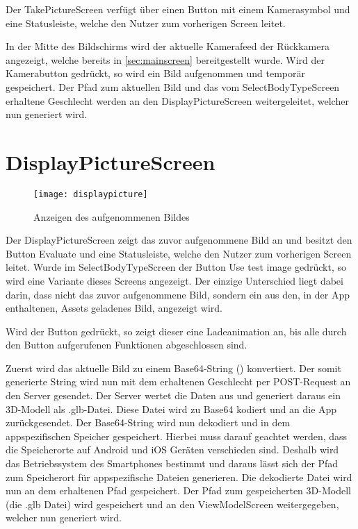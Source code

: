 Der TakePictureScreen verfügt über einen Button mit einem Kamerasymbol und eine Statusleiste, welche den Nutzer zum vorherigen Screen leitet.

In der Mitte des Bildschirms wird der aktuelle Kamerafeed der Rückkamera angezeigt, welche bereits in \ref{sec:mainscreen} bereitgestellt wurde. Wird der Kamerabutton gedrückt, 
so wird ein Bild aufgenommen und temporär gespeichert. Der Pfad zum aktuellen Bild und das vom SelectBodyTypeScreen erhaltene Geschlecht werden an den DisplayPictureScreen weitergeleitet, 
welcher nun generiert wird.

\clearpage
\section{DisplayPictureScreen}
\label{sec:displaypicture}
\begin{figure}[htpb]
    \centering
    \texttt{[image: displaypicture]}
    \caption{Anzeigen des aufgenommenen Bildes}
    \label{img:displaypicture}
\end{figure}

Der DisplayPictureScreen zeigt das zuvor aufgenommene Bild an und besitzt den Button \glqq{}Evaluate\grqq{} und eine Statusleiste, welche den Nutzer zum vorherigen Screen leitet. \newline
Wurde im SelectBodyTypeScreen der Button \glqq{}Use test image\grqq{} gedrückt, so wird eine Variante dieses Screens angezeigt. Der einzige Unterschied liegt dabei darin, dass nicht 
das zuvor aufgenommene Bild, sondern ein aus den, in der App enthaltenen, Assets geladenes Bild, angezeigt wird.

Wird der Button gedrückt, so zeigt dieser eine Ladeanimation an, bis alle durch den Button aufgerufenen Funktionen abgeschlossen sind.

Zuerst wird das aktuelle Bild zu einem Base64-String (\cite{misc:base64}) konvertiert. Der somit generierte String wird nun mit dem erhaltenen Geschlecht per POST-Request an den Server 
gesendet. Der Server wertet die Daten aus und generiert daraus ein 3D-Modell als .glb-Datei. Diese Datei wird zu Base64 kodiert und an die App zurückgesendet. \newline
Der Base64-String wird nun dekodiert und in dem appspezifischen Speicher gespeichert. Hierbei muss darauf geachtet werden, dass die Speicherorte auf Android und iOS Geräten 
verschieden sind. Deshalb wird das Betriebssystem des Smartphones bestimmt und daraus lässt sich der Pfad zum Speicherort für appspezifische Dateien generieren. Die dekodierte Datei 
wird nun an dem erhaltenen Pfad gespeichert. \newline
Der Pfad zum gespeicherten 3D-Modell (die .glb Datei) wird gespeichert und an den ViewModelScreen weitergegeben, welcher nun generiert wird.

